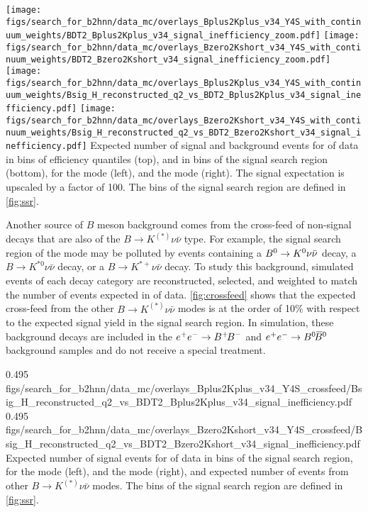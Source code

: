 {
\texttt{[image: figs/search\_for\_b2hnn/data\_mc/overlays\_Bplus2Kplus\_v34\_Y4S\_with\_continuum\_weights/BDT2\_Bplus2Kplus\_v34\_signal\_inefficiency\_zoom.pdf]}
\texttt{[image: figs/search\_for\_b2hnn/data\_mc/overlays\_Bzero2Kshort\_v34\_Y4S\_with\_continuum\_weights/BDT2\_Bzero2Kshort\_v34\_signal\_inefficiency\_zoom.pdf]}\\
\texttt{[image: figs/search\_for\_b2hnn/data\_mc/overlays\_Bplus2Kplus\_v34\_Y4S\_with\_continuum\_weights/Bsig\_H\_reconstructed\_q2\_vs\_BDT2\_Bplus2Kplus\_v34\_signal\_inefficiency.pdf]}
\texttt{[image: figs/search\_for\_b2hnn/data\_mc/overlays\_Bzero2Kshort\_v34\_Y4S\_with\_continuum\_weights/Bsig\_H\_reconstructed\_q2\_vs\_BDT2\_Bzero2Kshort\_v34\_signal\_inefficiency.pdf]}
}
{
Expected number of signal and background events for \lumion of data in bins of efficiency quantiles (top), and in bins of the signal search region (bottom), for the \BKpnn mode (left), and the \BKznn mode (right).
The signal expectation is upscaled by a factor of 100.
The bins of the signal search region are defined in \cref{fig:ssr}.
}

Another source of $B$ meson background comes from the cross-feed of non-signal decays that are also of the $B\to K^{(*)}\nu\bar\nu$ type.
For example, the signal search region of the \BKpnn mode may be polluted by events containing a $B^0\rightarrow K^0\nu\bar{\nu}$ decay, a $B\to K^{*0}\nu\bar\nu$ decay, or a $B\to K^{*+}\nu\bar\nu$ decay.
To study this background, simulated events of each decay category are reconstructed, selected, and weighted to match the number of events expected in \lumion of data.
\cref{fig:crossfeed} shows that the expected cross-feed from the other $B\to K^{(*)}\nu\bar\nu$ modes is at the order of 10\% with respect to the expected signal yield in the signal search region.
In simulation, these background decays are included in the $e^+e^-\rightarrow B^+ {\kern -0.16em B^-}$ and $\epem\to\BzBzb$ background samples and do not receive a special treatment.

{0.495}
{figs/search_for_b2hnn/data_mc/overlays_Bplus2Kplus_v34_Y4S_crossfeed/Bsig_H_reconstructed_q2_vs_BDT2_Bplus2Kplus_v34_signal_inefficiency.pdf}
{0.495}
{figs/search_for_b2hnn/data_mc/overlays_Bzero2Kshort_v34_Y4S_crossfeed/Bsig_H_reconstructed_q2_vs_BDT2_Bzero2Kshort_v34_signal_inefficiency.pdf}
{
Expected number of signal events for \lumion of data in bins of the signal search region, for the \BKpnn mode (left), and the \BKznn mode (right), and expected number of events from other $B\to K^{(*)}\nu\bar{\nu}$ modes.
The bins of the signal search region are defined in \cref{fig:ssr}.
}

